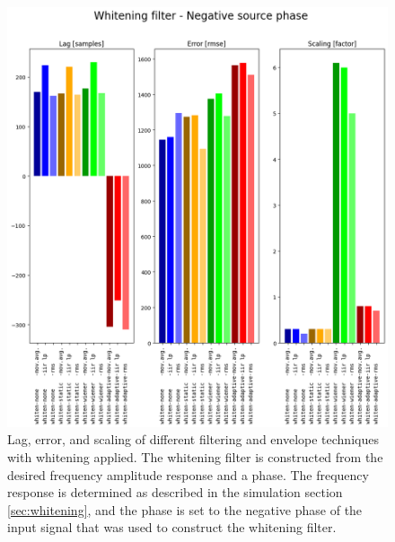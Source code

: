 \begin{figure}[h!t]
	\begin{center}
		\includegraphics[width=1.0\columnwidth]{images/result_whitening_negative_sourcephase.png}
	\end{center}
	\caption{Lag, error, and scaling of different filtering and envelope techniques with whitening applied. The whitening filter is constructed from the desired frequency amplitude response and a phase. The frequency response is determined as described in the simulation section \ref{sec:whitening}, and the phase is set to the negative phase of the input signal that was used to construct the whitening filter. }
	\label{fig:result_whitening_negative_sourcephase}
\end{figure}

